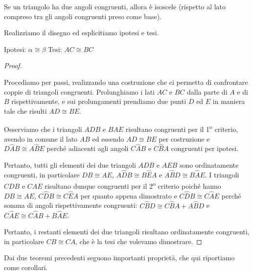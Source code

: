 \begin{teorema}
Se un triangolo ha due angoli congruenti, allora è isoscele (rispetto 
al lato compreso tra gli angoli congruenti preso come base).
\end{teorema}

Realizziamo il disegno ed esplicitiamo ipotesi e tesi.

\noindent Ipotesi: \(\alpha\cong \beta\)
\tab Tesi: \(AC\cong BC\)

\begin{proof}
\begin{multicols}{2}
Procediamo per passi, realizzando una costruzione che ci permetta di 
confrontare coppie di triangoli congruenti. Prolunghiamo i lati \(AC\) 
e \(BC\) dalla parte di \(A\) e di \(B\) rispettivamente, e sui 
prolungamenti prendiamo due punti \(D\) ed \(E\) in maniera tale che 
risulti \(AD\cong BE\).

Osserviamo che i triangoli \(ADB\) e \(BAE\) risultano congruenti per il 
1\textsuperscript{o} criterio, avendo in comune il lato \(AB\) ed 
essendo \(AD\cong BE\) per costruzione e \(D\widehat{A}B\cong 
A\widehat{B}E\) perché adiacenti agli angoli \(C\widehat{A}B\) e 
\(C\widehat{B}A\) congruenti per ipotesi. 
\begin{center}
\begin{inaccessibleblock}

\end{inaccessibleblock}
\end{center}
\end{multicols}

Pertanto, tutti gli elementi 
dei due triangoli \(ADB\) e \(AEB\) sono ordinatamente congruenti, in 
particolare \(DB\cong AE\), \(A\widehat{D}B\cong B\widehat{E}A\) e 
\(A\widehat{B}D\cong B\widehat{A}E\).
I triangoli \(CDB\) e \(CAE\) risultano dunque congruenti per il 
2\textsuperscript{o} criterio poiché hanno \(DB\cong AE\), 
\(C\widehat{D}B\cong C\widehat{E}A\) per quanto appena dimostrato e 
\(C\widehat{D}B\cong C\widehat{A}E\) perché somma di angoli 
rispettivamente congruenti: \(C\widehat{B}D\cong C\widehat{B}A + 
A\widehat{B}D\) e \(C\widehat{A}E\cong C\widehat{A}B + B\widehat{A}E\).

Pertanto, i restanti elementi dei due triangoli risultano 
ordinatamente congruenti, in particolare \(CB\cong CA\), che è la tesi 
che volevamo dimostrare.
\end{proof}


Dai due teoremi precedenti seguono importanti proprietà, che qui 
riportiamo come corollari.

